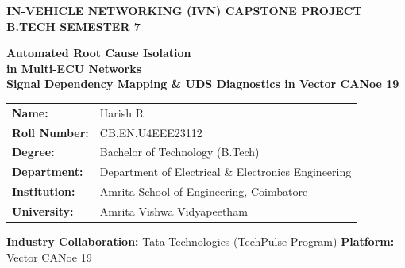 \documentclass[aspectratio=169,10pt]{beamer}
\begin{document}
\begin{frame}[t]
\vspace{-0.06cm}
\centering

\begin{tcolorbox}[colback=vectorred!10, colframe=vectorred!25, boxrule=0.5pt, arc=4pt, width=9.4cm, left=6pt, right=6pt, top=1.5pt, bottom=1.5pt]
  \centering\tiny\bfseries\color{vectorred} IN-VEHICLE NETWORKING (IVN) CAPSTONE PROJECT \quad\textbullet\quad B.TECH SEMESTER 7
\end{tcolorbox}

\vspace{0.20cm}
{\fontsize{25}{28}\selectfont\bfseries\color{vectorred} Automated Root Cause Isolation\\in Multi-ECU Networks}\\[8pt]
{\normalsize\bfseries\color{slatedark} Signal Dependency Mapping \& UDS Diagnostics in Vector CANoe 19}

\vspace{0.24cm}

\begin{tcolorbox}[
  colback=cardbg, colframe=vectorred!70, boxrule=0.8pt, arc=6pt,
  width=9.0cm, left=10pt, right=10pt, top=3pt, bottom=3pt,
  colbacktitle=vectorred, coltitle=white,
  toptitle=2pt, bottomtitle=2pt,
  title={\centering\tiny\bfseries STUDENT DETAILS}
]
  \scriptsize\color{slatedark}
  \begin{tabular}{@{}ll@{}}
    \textbf{Name:}        & Harish R \\[0.5pt]
    \textbf{Roll Number:} & CB.EN.U4EEE23112 \\[0.5pt]
    \textbf{Degree:}      & Bachelor of Technology (B.Tech) \\[0.5pt]
    \textbf{Department:}  & Department of Electrical \& Electronics Engineering \\[0.5pt]
    \textbf{Institution:} & Amrita School of Engineering, Coimbatore \\[0.5pt]
    \textbf{University:}  & Amrita Vishwa Vidyapeetham
  \end{tabular}
\end{tcolorbox}

\vspace{0.08cm}
{\scriptsize\color{slategrey}\textbf{Industry Collaboration:} Tata Technologies (TechPulse Program) \quad\textbullet\quad \textbf{Platform:} Vector CANoe 19}

\end{frame}
\end{document}
